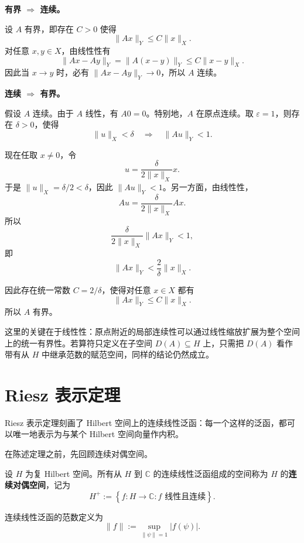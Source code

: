 \documentclass[UTF8,a4paper,11pt,openany]{ctexbook}
\begin{document}
\begin{proofblock}
\textbf{有界 $\Rightarrow$ 连续。}

设 $A$ 有界，即存在 $C>0$ 使得
\[
\|Ax\|_Y\leq C\|x\|_X.
\]
对任意 $x,y\in X$，由线性性有
\begin{equation}
    \|Ax-Ay\|_Y
    =
    \|A(x-y)\|_Y
    \leq
    C\|x-y\|_X.
\end{equation}
因此当 $x\to y$ 时，必有 $\|Ax-Ay\|_Y\to0$，所以 $A$ 连续。

\medskip

\textbf{连续 $\Rightarrow$ 有界。}

假设 $A$ 连续。由于 $A$ 线性，有 $A0=0$。特别地，$A$ 在原点连续。取 $\varepsilon=1$，则存在 $\delta>0$，使得
\[
\|u\|_X<\delta
\quad\Longrightarrow\quad
\|Au\|_Y<1.
\]

现在任取 $x\neq0$，令
\[
u
=
\frac{\delta}{2\|x\|_X}x.
\]
于是 $\|u\|_X=\delta/2<\delta$，因此 $\|Au\|_Y<1$。另一方面，由线性性，
\[
Au
=
\frac{\delta}{2\|x\|_X}Ax.
\]
所以
\begin{equation}
    \frac{\delta}{2\|x\|_X}\|Ax\|_Y<1,
\end{equation}
即
\begin{equation}
    \|Ax\|_Y
    <
    \frac{2}{\delta}\|x\|_X.
\end{equation}

因此存在统一常数 $C=2/\delta$，使得对任意 $x\in X$ 都有
\[
\|Ax\|_Y\leq C\|x\|_X.
\]
所以 $A$ 有界。
\end{proofblock}

这里的关键在于线性性：原点附近的局部连续性可以通过线性缩放扩展为整个空间上的统一有界性。若算符只定义在子空间 $D(A)\subseteq H$ 上，只需把 $D(A)$ 看作带有从 $H$ 中继承范数的赋范空间，同样的结论仍然成立。

\section{Riesz 表示定理}

Riesz 表示定理刻画了 Hilbert 空间上的连续线性泛函：每一个这样的泛函，都可以唯一地表示为与某个 Hilbert 空间向量作内积。

在陈述定理之前，先回顾连续对偶空间。

\begin{definition}[连续对偶空间]
设 $H$ 为复 Hilbert 空间。所有从 $H$ 到 $\mathbb C$ 的连续线性泛函组成的空间称为 $H$ 的\textbf{连续对偶空间}，记为
\begin{equation}
    H^+
    :=
    \left\{
    f:H\to\mathbb C:
    f\text{ 线性且连续}
    \right\}.
\end{equation}

连续线性泛函的范数定义为
\begin{equation}
    \|f\|
    :=
    \sup_{\|\psi\|=1}|f(\psi)|.
\end{equation}
\end{definition}
\end{document}
